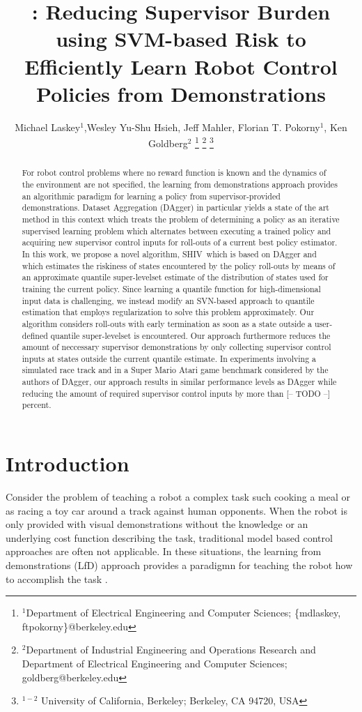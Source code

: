 \documentclass[10pt, conference]{ieeeconf}      %
\title{\LARGE \bf \acro: Reducing Supervisor Burden using SVM-based Risk to Efficiently Learn Robot Control Policies from Demonstrations }
\author{Michael Laskey$^1$,Wesley Yu-Shu Hsieh, Jeff Mahler, Florian T. Pokorny$^1$, Ken Goldberg$^2$%
\thanks{$^1$Department of Electrical Engineering and Computer Sciences; {\small \{mdlaskey, ftpokorny\}@berkeley.edu}}%
\thanks{$^2$Department of Industrial Engineering and Operations Research and Department of Electrical Engineering and Computer Sciences; {\small goldberg@berkeley.edu}}%
\thanks{$^{1-2}$ University of California, Berkeley;  Berkeley, CA 94720, USA}%
}
\newcommand{\acro}{SHIV}
\begin{document}
\maketitle
\thispagestyle{empty}
\pagestyle{empty}



\begin{abstract}
For robot control problems where no reward function is known and the dynamics of the environment are not specified, the
learning from demonstrations approach provides an algorithmic paradigm for learning a policy from supervisor-provided
demonstrations. Dataset Aggregation (DAgger) in particular yields a state of the art method in this context which treats
the problem of determining a policy as an iterative supervised learning problem which alternates between executing a
trained policy and acquiring new supervisor control inputs for roll-outs of a current best policy estimator. In this
work, we propose a novel algorithm, \acro~which is based on DAgger and which estimates the riskiness of states
encountered by the policy roll-outs by means of an approximate quantile super-levelset estimate of the distribution of
states used for training the current policy. Since learning a quantile function for high-dimensional input data is
challenging, we instead modify an SVN-based approach to quantile estimation that employs regularization to solve this
problem approximately. Our algorithm considers roll-outs with early termination as soon as a state outside a
user-defined quantile super-levelset is encountered. Our approach furthermore reduces the amount of neccessary
supervisor demonstrations by only collecting supervisor control inputs at states outside the current quantile estimate.
In experiments involving a simulated race track and in a Super Mario Atari game benchmark considered by the authors of
DAgger, our approach results in similar performance levels as DAgger while reducing the amount of required supervisor
control inputs by more than {\color{blue}[-- TODO --]} percent.
\end{abstract}



\section{Introduction} 
Consider the problem of teaching a robot a complex task such cooking a meal or as racing a toy car around a track
against human opponents. When the robot is only provided with visual demonstrations without the knowledge or an
underlying cost function describing the task, traditional model based control approaches are often not applicable. In
these situations, the learning from demonstrations (LfD) approach provides a paradigmn for teaching the robot how to
accomplish the task \cite{ross2013learning,pomerleau1989alvinn,schulman2013case}.
\end{document}
